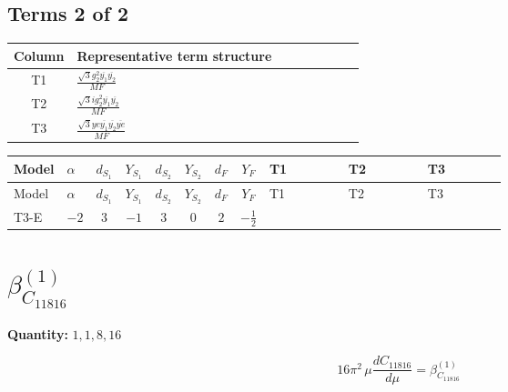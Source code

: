 \documentclass[8pt]{article}
\begin{document}
\begin{landscape}
\subsection*{Terms 2 of 2}
\begin{center}
\begin{tabular}{@{}c >{\raggedright\arraybackslash}p{0.82\linewidth}@{}}
\toprule
Column & Representative term structure \\
\midrule
T1 & \(\displaystyle \frac{\sqrt{3} g_{2}^{2} \overline{y_{1}} \overline{y_{2}}}{MF}\) \\
\midrule
T2 & \(\displaystyle \frac{\sqrt{3} i g_{2}^{2} \overline{y_{1}} \overline{y_{2}}}{MF}\) \\
\midrule
T3 & \(\displaystyle \frac{\sqrt{3} ye \overline{y_{1}} \overline{y_{2}} \overline{ye}}{MF}\) \\
\midrule
\bottomrule
\end{tabular}
\end{center}
\smallskip
\tiny
\begin{longtable}{@{}llcccccc >{\raggedright\arraybackslash}p{0.21\linewidth} >{\raggedright\arraybackslash}p{0.21\linewidth} >{\raggedright\arraybackslash}p{0.21\linewidth}@{}}
\toprule
Model & $\alpha$ & $d_{S_1}$ & $Y_{S_1}$ & $d_{S_2}$ & $Y_{S_2}$ & $d_F$ & $Y_F$ & T1 & T2 & T3 \\
\midrule
\endfirsthead
\toprule
Model & $\alpha$ & $d_{S_1}$ & $Y_{S_1}$ & $d_{S_2}$ & $Y_{S_2}$ & $d_F$ & $Y_F$ & T1 & T2 & T3 \\
\midrule
\endhead
T3-E & $-2$ & $3$ & $-1$ & $3$ & $0$ & $2$ & $-\frac{1}{2}$ & \scriptsize\adjustbox{max width=\linewidth}{$\begin{gathered} \frac{11 \sqrt{3} g_{2}^{2} \overline{y_{1}} \overline{y_{2}}}{8 MF}\end{gathered}$} & \scriptsize\adjustbox{max width=\linewidth}{$\begin{gathered} - \frac{\sqrt{3} i g_{2}^{2} \overline{y_{1}} \overline{y_{2}}}{6 MF}\end{gathered}$} & \scriptsize\adjustbox{max width=\linewidth}{$\begin{gathered} - \frac{\sqrt{3} ye \overline{y_{1}} \overline{y_{2}} \overline{ye}}{12 MF}\end{gathered}$} \\
\midrule
\bottomrule
\end{longtable}
\clearpage
\section*{$\beta_{C_{11816}}^{(1)}$}
\noindent\textbf{Quantity: }$\mathrm{1,1,8,16}$\par\smallskip
\[16\pi^2\,\mu\frac{d C_{11816}}{d\mu}=\beta_{C_{11816}}^{(1)}\]

\end{landscape}
\end{document}

